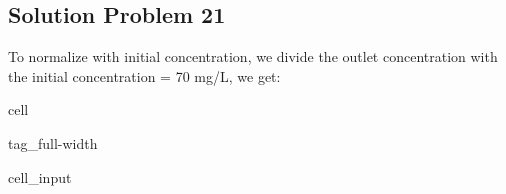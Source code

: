 \documentclass[letterpaper,10pt,english]{jupyterBook}
\begin{document}
\subsection{Solution Problem 21}
\label{\detokenize{content/tutorials/T8/tutorial_08:solution-problem-21}}
\sphinxAtStartPar
{}

\sphinxAtStartPar
To normalize with initial concentration, we divide the outlet concentration with the initial concentration = 70 mg/L, we get:

\begin{sphinxuseclass}{cell}
\begin{sphinxuseclass}{tag_full-width}\begin{sphinxVerbatimInput}

\begin{sphinxuseclass}{cell_input}
\begin{sphinxVerbatim}[commandchars=\\\{\}]

   

   

      
  

  
 

\end{sphinxVerbatim}

\end{sphinxuseclass}\end{sphinxVerbatimInput}
\begin{sphinxVerbatimOutput}


\end{sphinxVerbatimOutput}
\end{sphinxuseclass}
\end{sphinxuseclass}
\end{document}
